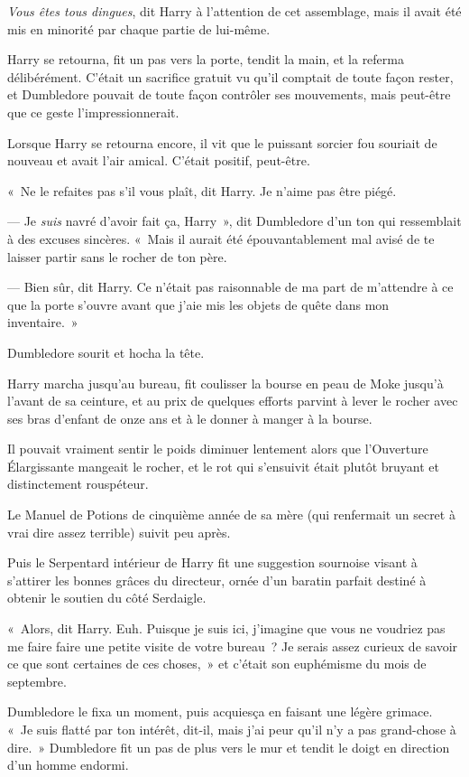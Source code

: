 \emph{Vous êtes tous dingues}, dit Harry à l'attention de cet assemblage, mais il avait été mis en minorité par chaque partie de lui-même.

Harry se retourna, fit un pas vers la porte, tendit la main, et la referma délibérément. C'était un sacrifice gratuit vu qu'il comptait de toute façon rester, et Dumbledore pouvait de toute façon contrôler ses mouvements, mais peut-être que ce geste l'impressionnerait.

Lorsque Harry se retourna encore, il vit que le puissant sorcier fou souriait de nouveau et avait l'air amical. C'était positif, peut-être.

«~Ne le refaites pas s'il vous plaît, dit Harry. Je n'aime pas être piégé.

--- Je \emph{suis} navré d'avoir fait ça, Harry~», dit Dumbledore d'un ton qui ressemblait à des excuses sincères. «~Mais il aurait été épouvantablement mal avisé de te laisser partir sans le rocher de ton père.

--- Bien sûr, dit Harry. Ce n'était pas raisonnable de ma part de m'attendre à ce que la porte s'ouvre avant que j'aie mis les objets de quête dans mon inventaire.~»

Dumbledore sourit et hocha la tête.

Harry marcha jusqu'au bureau, fit coulisser la bourse en peau de Moke jusqu'à l'avant de sa ceinture, et au prix de quelques efforts parvint à lever le rocher avec ses bras d'enfant de onze ans et à le donner à manger à la bourse.

Il pouvait vraiment sentir le poids diminuer lentement alors que l'Ouverture Élargissante mangeait le rocher, et le rot qui s'ensuivit était plutôt bruyant et distinctement rouspéteur.

Le Manuel de Potions de cinquième année de sa mère (qui renfermait un secret à vrai dire assez terrible) suivit peu après.

Puis le Serpentard intérieur de Harry fit une suggestion sournoise visant à s'attirer les bonnes grâces du directeur, ornée d'un baratin parfait destiné à obtenir le soutien du côté Serdaigle.

«~Alors, dit Harry. Euh. Puisque je suis ici, j'imagine que vous ne voudriez pas me faire faire une petite visite de votre bureau~? Je serais assez curieux de savoir ce que sont certaines de ces choses,~» et c'était son euphémisme du mois de septembre.

Dumbledore le fixa un moment, puis acquiesça en faisant une légère grimace. «~Je suis flatté par ton intérêt, dit-il, mais j'ai peur qu'il n'y a pas grand-chose à dire.~» Dumbledore fit un pas de plus vers le mur et tendit le doigt en direction d'un homme endormi.

